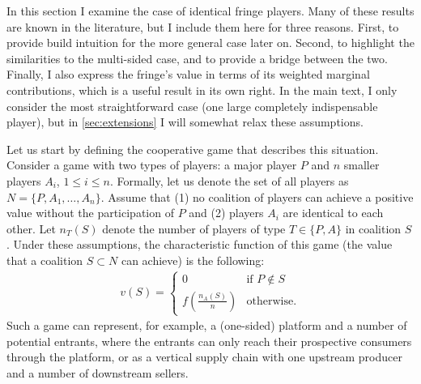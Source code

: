 \documentclass[a4paper]{article}
\begin{document}
In this section I examine the case of identical fringe players.
Many of these results are known in the literature, but I include them here for three reasons.
First, to provide build intuition for the more general case later on.
Second, to highlight the similarities to the multi-sided case, and to provide a bridge between the two.
Finally, I also express the fringe's value in terms of its weighted marginal contributions, which is a useful result in its own right.
In the main text, I only consider the most straightforward case (one large completely indispensable player), but in \ref{sec:extensions} I will somewhat relax these assumptions.

Let us start by defining the cooperative game that describes this situation.
Consider a game with two types of players: a major player $P$ and $n$ smaller players $A_i$, $1 \leq i \leq n$.
Formally, let us denote the set of all players as $N = \{P, A_1, \dots, A_n\}$.
Assume that (1) no coalition of players can achieve a positive value without the participation of $P$ and (2) players $A_i$ are identical to each other.
Let $n_T(S)$ denote the number of players of type $T \in \{P, A\}$ in coalition $S$.
Under these assumptions, the characteristic function of this game (the value that a coalition $S \subset N$ can achieve) is the following:
\begin{align*}
    v(S) = \begin{cases}
        0                              & \text{if } P \notin S \\
        f\left(\frac{n_A(S)}{n}\right) & \text{otherwise}.
    \end{cases}
\end{align*}
Such a game can represent, for example, a (one-sided) platform and a number of potential entrants, where the entrants can only reach their prospective consumers through the platform, or as a vertical supply chain with one upstream producer and a number of downstream sellers.
\end{document}
